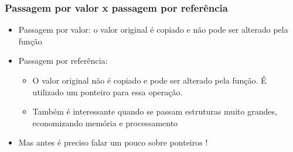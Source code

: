 \documentclass{beamer}
\begin{document}
\begin{frame}
\end{frame}

\begin{frame}
	\frametitle{Passagem por valor x passagem por referência}
	\begin{itemize}
		\item Passagem por valor: o valor original é copiado e não pode ser alterado pela função
		\item Passagem por referência:
		\begin{itemize}
			\item O valor original não é copiado e pode ser alterado pela função. É utilizado um ponteiro para essa operação.
			\item Também é interessante quando se passam estruturas muito grandes, economizando memória e processamento
		\end{itemize}
       \item Mas antes é preciso falar um pouco sobre ponteiros !
	\end{itemize}
\end{frame}
\end{document}
